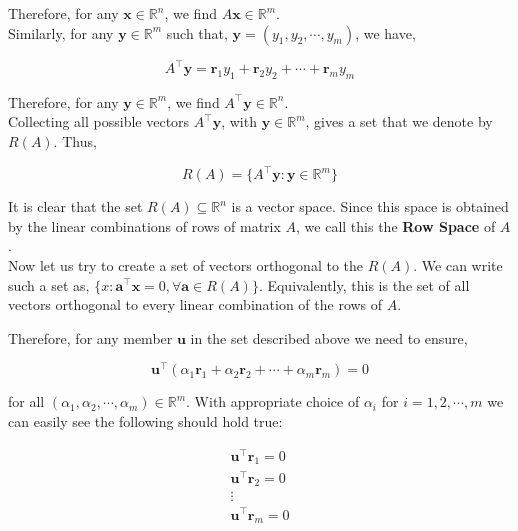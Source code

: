 \documentclass[a4paper]{article}
\begin{document}
Therefore, for any $\boldsymbol{x} \in \mathbb{R}^n$, we find $A\boldsymbol{x} \in \mathbb{R}^m$.\\

Similarly, for any $\boldsymbol{y} \in \mathbb{R}^{m}$ such that, $\boldsymbol{y} = \left( y_1, y_2, \cdots, y_m \right)$, we have,

\begin{equation}
A^{\top}\boldsymbol{y} = \boldsymbol{r}_1 y_1 + \boldsymbol{r}_2 y_2 + \cdots + \boldsymbol{r}_m y_m
\end{equation}

Therefore, for any $\boldsymbol{y} \in \mathbb{R}^m$, we find $A^{\top}\boldsymbol{y} \in \mathbb{R}^n$.\\

Collecting all possible vectors $A^{\top}\boldsymbol{y}$, with $\boldsymbol{y} \in \mathbb{R}^m$, gives a set that we denote by $R(A)$. Thus,

\begin{equation}
R(A) = \{ A^{\top}\boldsymbol{y} : \boldsymbol{y} \in \mathbb{R}^m \}
\end{equation}

It is clear that the set $R(A) \subseteq \mathbb{R}^n$ is a vector space. Since this space is obtained by the linear combinations of rows of matrix $A$, we call this the \textbf{Row Space} of $A$.\\

Now let us try to create a set of vectors orthogonal to the $R(A)$. We can write such a set as,
$\{ x: \boldsymbol{a}^{\top}\boldsymbol{x} = 0, \forall \boldsymbol{a} \in R(A) \}$. Equivalently, this is the set of all vectors orthogonal to every linear combination of the rows of $A$.

Therefore, for any member $\boldsymbol{u}$ in the set described above we need to ensure,

\begin{equation}
\boldsymbol{u}^{\top}\left( \alpha_1 \boldsymbol{r}_1 + \alpha_2 \boldsymbol{r}_2 + \cdots + \alpha_m \boldsymbol{r}_m \right) = 0
\end{equation}

for all $\left( \alpha_1, \alpha_2, \cdots, \alpha_m \right) \in \mathbb{R}^m$. With appropriate choice of $\alpha_i$ for $i=1,2,\cdots,m$ we can easily see the following should hold true:

\begin{eqnarray}
\boldsymbol{u}^{\top}\boldsymbol{r}_1 = 0 \\
\boldsymbol{u}^{\top}\boldsymbol{r}_2 = 0 \\
\vdots\\
\boldsymbol{u}^{\top}\boldsymbol{r}_m = 0
\end{eqnarray}
\end{document}
